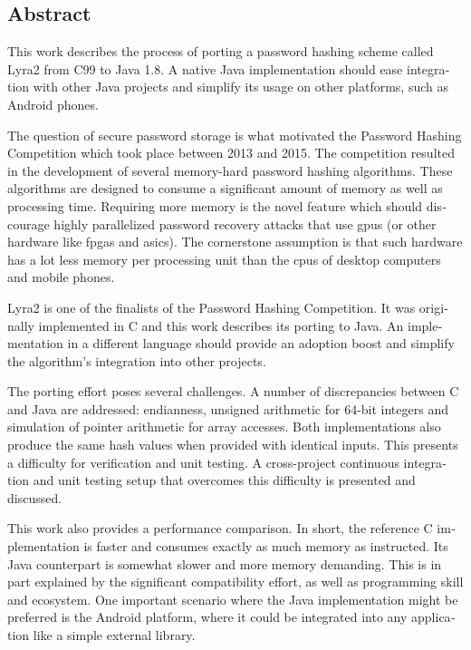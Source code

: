 \cleardoublepage
{}

\begin{otherlanguage}{english}
\chapter*{Abstract}

This work describes the process of porting a password hashing scheme called Lyra2 from C99 to Java 1.8. A native Java implementation should ease integration with other Java projects and simplify its usage on other platforms, such as Android phones.

The question of secure password storage is what motivated the Password Hashing Competition which took place between 2013 and 2015. The competition resulted in the development of several memory-hard password hashing algorithms. These algorithms are designed to consume a significant amount of memory as well as processing time. Requiring more memory is the novel feature which should discourage highly parallelized password recovery attacks that use \gls{gpus} (or other hardware like \gls{fpgas} and \gls{asics}). The cornerstone assumption is that such hardware has a lot less memory per processing unit than the \gls{cpus} of desktop computers and mobile phones.

Lyra2 is one of the finalists of the Password Hashing Competition. It was originally implemented in C and this work describes its porting to Java. An implementation in a different language should provide an adoption boost and simplify the algorithm's integration into other projects.

The porting effort poses several challenges. A number of discrepancies between C and Java are addressed: endianness, unsigned arithmetic for 64-bit integers and simulation of pointer arithmetic for array accesses. Both implementations also produce the same hash values when provided with identical inputs. This presents a difficulty for verification and unit testing. A cross-project continuous integration and unit testing setup that overcomes this difficulty is presented and discussed.

This work also provides a performance comparison. In short, the reference C implementation is faster and consumes exactly as much memory as instructed. Its Java counterpart is somewhat slower and more memory demanding. This is in part explained by the significant compatibility effort, as well as programming skill and ecosystem. One important scenario where the Java implementation might be preferred is the Android platform, where it could be integrated into any application like a simple external library.


\end{otherlanguage}
